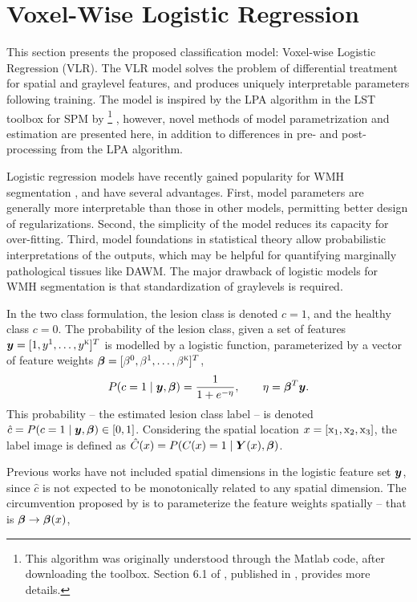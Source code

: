\section{Voxel-Wise Logistic Regression}\label{s:vlr}
This section presents the proposed classification model: Voxel-wise Logistic Regression (VLR). The VLR model solves the problem of differential treatment for spatial and graylevel features, and produces uniquely interpretable parameters following training. The model is inspired by the LPA algorithm in the LST toolbox for SPM by \citeauthor{Schmidt2015} \cite{Schmidt2015,Schmidt2017a}%
\footnote{This algorithm was originally understood through the Matlab code, after downloading the toolbox. Section 6.1 of \cite{Schmidt2017a}, published in \citeyear{Schmidt2017a}, provides more details.}%
, however, novel methods of model parametrization and estimation are presented here, in addition to differences in pre- and post-processing from the LPA algorithm.
\par
Logistic regression models have recently gained popularity for WMH segmentation \cite{Sweeney2013a,Sweeney2013,Schmidt2017a,Zhan2017}, and have several advantages.
First, model parameters are generally more interpretable than those in other models, permitting better design of regularizations.
Second, the simplicity of the model reduces its capacity for over-fitting. 
Third, model foundations in statistical theory allow probabilistic interpretations of the outputs, which may be helpful for quantifying marginally pathological tissues like DAWM.
The major drawback of logistic models for WMH segmentation is that standardization of graylevels is required.
\par
In the two class formulation, the lesion class is denoted $c=1$, and the healthy class $c=0$. The probability of the lesion class, given a set of features $\bm{y} = [1,y^1,\dots,y^{\textsc{k}}]^T$ is modelled by a logistic function, parameterized by a vector of feature weights $\bm{\beta} = [\beta^0,\beta^1,\dots,\beta^{\textsc{k}}]^T$,
\begin{equation}
  P(c=1\mid\bm{y},\bm{\beta}) = \frac{1}{1+e^{-\eta}},\qquad\eta = \bm{\beta}^T\bm{y}.
  \label{eq:lrmodel}
\end{equation}
This probability -- the estimated lesion class label -- is denoted $\hat{c} = P(c=1\mid\bm{y},\bm{\beta}) \in [0,1]$. Considering the spatial location $x = [\mathrm{x}_1,\mathrm{x}_2,\mathrm{x}_3]$, the label image is defined as $\hat{C}(x) = P(C(x)=1\mid\bm{Y}(x),\bm{\beta})$.
\par
Previous works have not included spatial dimensions in the logistic feature set $\bm{y}$, since $\hat{c}$ is not expected to be monotonically related to any spatial dimension. The circumvention proposed by \citeauthor{Schmidt2015} is to parameterize the feature weights spatially -- that is $\bm{\beta}\rightarrow\bm{\beta}(x)$,
